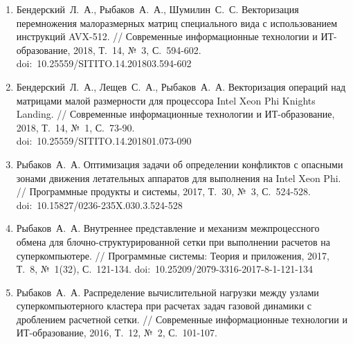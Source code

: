 \documentclass[a4paper,14pt]{extarticle}                     %
\theoremstyle{plain}                                         %
\begin{document}
\begin{enumerate}[noitemsep,topsep=0pt,parsep=0pt,partopsep=0pt]
\item Бендерский~Л.~А., Рыбаков~А.~А., Шумилин~С.~С. Векторизация перемножения малоразмерных матриц специального вида с использованием инструкций AVX-512. // Современные информационные технологии и ИТ-образование, 2018, Т.~14, №~3, С.~594-602. \\ doi:~10.25559/SITITO.14.201803.594-602
\item Бендерский~Л.~А., Лещев~С.~А., Рыбаков~А.~А. Векторизация операций над матрицами малой размерности для процессора Intel Xeon Phi Knights Landing. // Современные информационные технологии и ИТ-образование, 2018, Т.~14, №~1, С.~73-90. \\ doi:~10.25559/SITITO.14.201801.073-090
\item Рыбаков~А.~А. Оптимизация задачи об определении конфликтов с опасными зонами движения летательных аппаратов для выполнения на Intel Xeon Phi. // Программные продукты и системы, 2017, Т.~30, №~3, С.~524-528. doi:~10.15827/0236-235X.030.3.524-528
\item Рыбаков~А.~А. Внутреннее представление и механизм межпроцессного обмена для блочно-структурированной сетки при выполнении расчетов на суперкомпьютере. // Программные системы: Теория и приложения, 2017, Т.~8, №~1(32), С.~121-134. doi:~10.25209/2079-3316-2017-8-1-121-134
\item Рыбаков~А.~А. Распределение вычислительной нагрузки между узлами суперкомпьютерного кластера при расчетах задач газовой динамики с дроблением расчетной сетки. // Современные информационные технологии и ИТ-образование, 2016, Т.~12, №~2, С.~101-107.
\end{enumerate}
\end{document}
